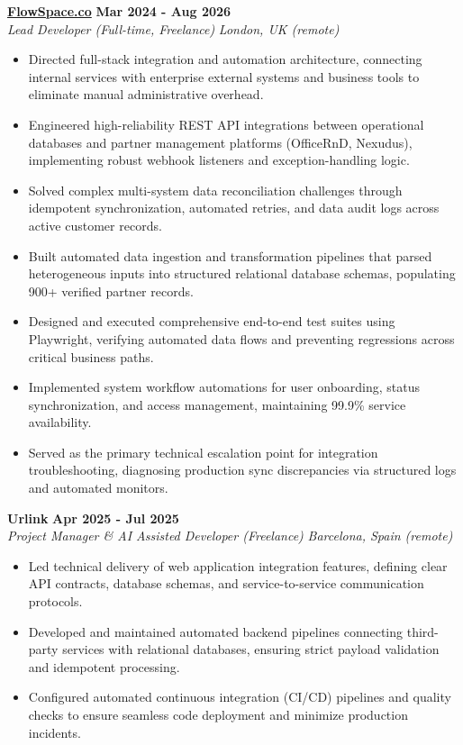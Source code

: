 \documentclass[10pt,a4paper]{article}
\newcommand{\role}[4]{%
  \textbf{#1} \hfill \textbf{#2}\\[1pt]%
  \textit{#3} \hfill \textit{#4}\\[2pt]%
}
\begin{document}
\role{\href{https://flowspace.co}{FlowSpace.co}}{Mar 2024 - Aug 2026}{Lead Developer (Full-time, Freelance)}{London, UK (remote)}
\begin{itemize}
  \item Directed full-stack integration and automation architecture, connecting internal services with enterprise external systems and business tools to eliminate manual administrative overhead.
  \item Engineered high-reliability REST API integrations between operational databases and partner management platforms (OfficeRnD, Nexudus), implementing robust webhook listeners and exception-handling logic.
  \item Solved complex multi-system data reconciliation challenges through idempotent synchronization, automated retries, and data audit logs across active customer records.
  \item Built automated data ingestion and transformation pipelines that parsed heterogeneous inputs into structured relational database schemas, populating 900+ verified partner records.
  \item Designed and executed comprehensive end-to-end test suites using Playwright, verifying automated data flows and preventing regressions across critical business paths.
  \item Implemented system workflow automations for user onboarding, status synchronization, and access management, maintaining 99.9\% service availability.
  \item Served as the primary technical escalation point for integration troubleshooting, diagnosing production sync discrepancies via structured logs and automated monitors.
\end{itemize}

\role{Urlink}{Apr 2025 - Jul 2025}{Project Manager \& AI Assisted Developer (Freelance)}{Barcelona, Spain (remote)}
\begin{itemize}
  \item Led technical delivery of web application integration features, defining clear API contracts, database schemas, and service-to-service communication protocols.
  \item Developed and maintained automated backend pipelines connecting third-party services with relational databases, ensuring strict payload validation and idempotent processing.
  \item Configured automated continuous integration (CI/CD) pipelines and quality checks to ensure seamless code deployment and minimize production incidents.
\end{itemize}
\end{document}
